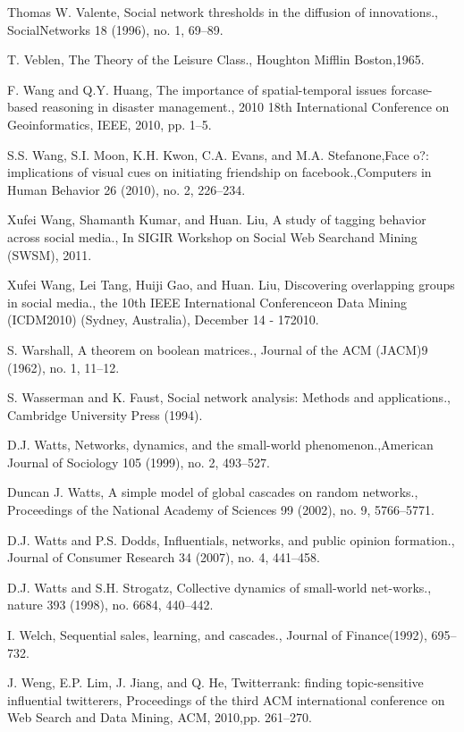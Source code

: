 \begin{thebibliography}{999}
 Thomas W. Valente, Social network thresholds in the diffusion of innovations., SocialNetworks 18 (1996), no. 1, 69–89.

 T. Veblen, The Theory of the Leisure Class., Houghton Mifflin Boston,1965.

 F. Wang and Q.Y. Huang, The importance of spatial-temporal issues forcase-based reasoning in disaster management., 2010 18th International Conference on Geoinformatics, IEEE, 2010, pp. 1–5.

 S.S. Wang, S.I. Moon, K.H. Kwon, C.A. Evans, and M.A. Stefanone,Face o?: implications of visual cues on initiating friendship on facebook.,Computers in Human Behavior 26 (2010), no. 2, 226–234.

 Xufei Wang, Shamanth Kumar, and Huan. Liu, A study of tagging behavior across social media., In SIGIR Workshop on Social Web Searchand Mining (SWSM), 2011.

 Xufei Wang, Lei Tang, Huiji Gao, and Huan. Liu, Discovering overlapping groups in social media., the 10th IEEE International Conferenceon Data Mining (ICDM2010) (Sydney, Australia), December 14 - 172010.

 S. Warshall, A theorem on boolean matrices., Journal of the ACM (JACM)9 (1962), no. 1, 11–12.

 S. Wasserman and K. Faust, Social network analysis: Methods and applications., Cambridge University Press (1994).

 D.J. Watts, Networks, dynamics, and the small-world phenomenon.,American Journal of Sociology 105 (1999), no. 2, 493–527.

 Duncan J. Watts, A simple model of global cascades on random networks., Proceedings of the National Academy of Sciences 99 (2002), no. 9, 5766–5771.

 D.J. Watts and P.S. Dodds, Influentials, networks, and public opinion formation., Journal of Consumer Research 34 (2007), no. 4, 441–458.

 D.J. Watts and S.H. Strogatz, Collective dynamics of small-world net-works., nature 393 (1998), no. 6684, 440–442.

 I. Welch, Sequential sales, learning, and cascades., Journal of Finance(1992), 695–732.

 J. Weng, E.P. Lim, J. Jiang, and Q. He, Twitterrank: finding topic-sensitive influential twitterers, Proceedings of the third ACM international conference on Web Search and Data Mining, ACM, 2010,pp. 261–270.


\end{thebibliography}
